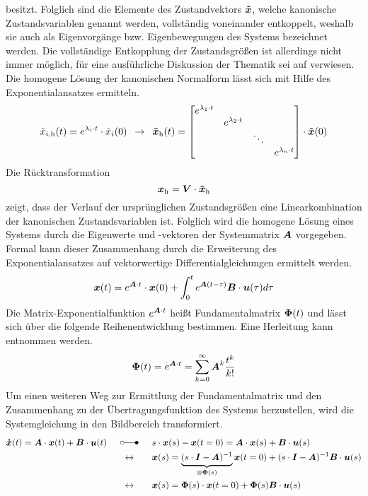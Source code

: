 besitzt. Folglich sind die Elemente des Zustandvektors $\boldsymbol{\tilde{x}}$, welche kanonische Zustandsvariablen genannt werden, vollständig voneinander entkoppelt, weshalb sie auch als  Eigenvorgänge bzw. Eigenbewegungen des Systems bezeichnet werden. Die vollständige Entkopplung der Zustandsgrößen ist allerdings nicht immer möglich, für eine ausführliche Diskussion der Thematik sei auf \cite[S. 135 ff.]{LunzeRT1} verwiesen.
Die homogene Lösung der kanonischen Normalform lässt sich mit Hilfe des Exponentialansatzes ermitteln.
\begin{equation}
\tilde{x}_{i\text{,h}}(t) = e^{\lambda_i\cdot t}\cdot \tilde{x}_i(0) \hspace{5pt}\rightarrow\hspace{5pt} \boldsymbol{\tilde{x}}_{\text{h}}(t) = \begin{bmatrix}
e^{\lambda_{\text{1}}\cdot t} &  & \\
& e^{\lambda_{\text{2}}\cdot t}  & \\
&  & \ddots & \\
&  & & e^{\lambda_n\cdot t}
\end{bmatrix}\cdot \boldsymbol{\tilde{x}}(0)
\end{equation}
Die Rücktransformation
\begin{equation}
\boldsymbol{x}_{\text{h}} = \boldsymbol{V}\cdot \boldsymbol{\tilde{x}}_{\text{h}}
\end{equation}
zeigt, dass der Verlauf der ursprünglichen Zustandsgrößen eine Linearkombination der kanonischen Zustandsvariablen ist. Folglich wird die homogene Lösung eines Systems durch die Eigenwerte und -vektoren der Systemmatrix $\boldsymbol{A}$ vorgegeben. 
Formal kann dieser Zusammenhang durch die Erweiterung des Exponentialansatzes auf vektorwertige Differentialgleichungen ermittelt werden.
\begin{equation}
\boldsymbol{x}(t) = e^{\boldsymbol{A}\cdot t}\cdot \boldsymbol{x}(0) + \int^t_0 e^{\boldsymbol{A}(t-\tau)}\boldsymbol{B}\cdot \boldsymbol{u}(\tau)d\tau
\label{eq_fMat_zeitbereich}
\end{equation}
Die Matrix-Exponentialfunktion $e^{\boldsymbol{A}\cdot t}$ heißt Fundamentalmatrix $\boldsymbol{\Phi}(t)$ und lässt sich über die folgende Reihenentwicklung bestimmen. Eine Herleitung kann \cite[S. 6 ff.]{UnbehauenRT2} entnommen werden. 
\begin{equation}
\boldsymbol{\Phi}(t) = e^{\boldsymbol{A}\cdot t} = \sum^{\infty}_{k=0} \boldsymbol{A}^k\frac{t^k}{k!}
\end{equation}
Um einen weiteren Weg zur Ermittlung der Fundamentalmatrix und den Zusammenhang zu der Übertragungsfunktion des Systems herzustellen, wird die Systemgleichung in den Bildbereich transformiert.
\begin{equation}
\begin{split}
\bs{\dot{x}}(t) = \bs{A}\cdot \bs{x}(t) + \bs{B}\cdot\bs{u}(t) \myLaplace &s\cdot\bs{x}(s) - \bs{x}(t=0) = \bs{A}\cdot \bs{x}(s) + \bs{B}\cdot \bs{u}(s)
\\
\leftrightarrow \hspace{20pt} &\bs{x}(s) = \underbrace{(s\cdot \bs{I} - \bs{A})^{-1}}_{\equiv \bs{\Phi}(s)}\bs{x}(t=0) + (s\cdot \bs{I}-\bs{A})^{-1}\bs{B}\cdot \bs{u}(s) 
\\
\leftrightarrow \hspace{20pt}&\bs{x}(s) = \bs{\Phi}(s)\cdot \bs{x}(t=0) +\bs{\Phi}(s)\bs{B}\cdot \bs{u}(s)
\end{split}
\label{eq_fMat_bildbereich}
\end{equation}
